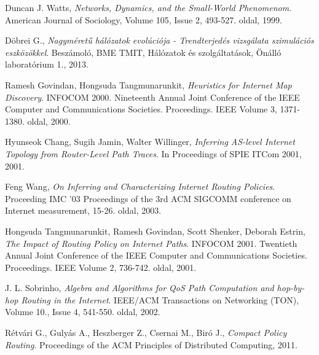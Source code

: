 
\begin{thebibliography}{9}

 Duncan J. Watts, \emph {Networks, Dynamics, and the Small-World Phenomenom}.
American Journal of Sociology, Volume 105, Issue 2, 493-527. oldal, 1999.

 Döbrei G., \emph {Nagyméretű hálózatok evolúciója - Trendterjedés vizsgálata szimulációs eszközökkel}.
Beszámoló, BME TMIT, Hálózatok és szolgáltatások, Önálló laboratórium 1., 2013.


 Ramesh Govindan, Hongsuda Tangmunarunkit, \emph {Heuristics for Internet Map Discovery}.
INFOCOM 2000. Nineteenth Annual Joint Conference of the IEEE Computer and Communications Societies. Proceedings. IEEE Volume 3, 1371-1380. oldal, 2000.

 Hyunseok Chang, Sugih Jamin, Walter Willinger, \emph {Inferring AS-level Internet Topology from Router-Level Path Traces}.
In Proceedings of SPIE ITCom 2001, 2001.

 Feng Wang, \emph {On Inferring and Characterizing Internet Routing Policies}.
Proceeding IMC '03 Proceedings of the 3rd ACM SIGCOMM conference on Internet measurement, 15-26. oldal, 2003.

 Hongsuda Tangmunarunkit, Ramesh Govindan, Scott Shenker, Deborah Estrin, \emph {The Impact of Routing Policy on Internet Paths}.
INFOCOM 2001. Twentieth Annual Joint Conference of the IEEE Computer and Communications Societies. Proceedings. IEEE Volume 2, 736-742. oldal, 2001.

 J. L. Sobrinho, \emph {Algebra and Algorithms for QoS Path Computation and hop-by-hop Routing in the Internet}.
IEEE/ACM Transactions on Networking (TON), Volume 10., Issue 4, 541-550. oldal, 2002.

 Rétvári G., Gulyás A., Heszberger Z., Csernai M., Biró J., \emph {Compact Policy Routing}.
Proceedings of the ACM Principles of Distributed Computing, 2011.


\end{thebibliography}
